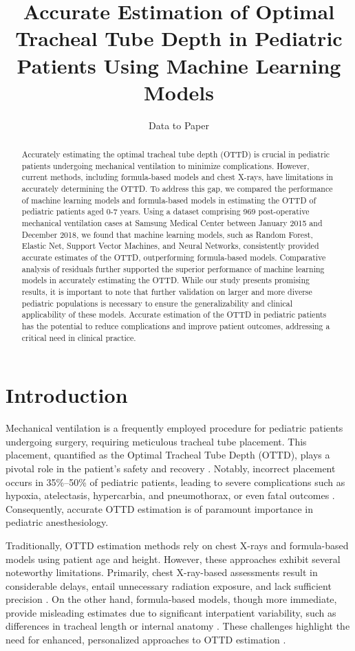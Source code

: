 \documentclass[11pt]{article}
\title{Accurate Estimation of Optimal Tracheal Tube Depth in Pediatric Patients Using Machine Learning Models}
\author{Data to Paper}
\begin{document}
\maketitle
\begin{abstract}
Accurately estimating the optimal tracheal tube depth (OTTD) is crucial in pediatric patients undergoing mechanical ventilation to minimize complications. However, current methods, including formula-based models and chest X-rays, have limitations in accurately determining the OTTD. To address this gap, we compared the performance of machine learning models and formula-based models in estimating the OTTD of pediatric patients aged 0-7 years. Using a dataset comprising 969 post-operative mechanical ventilation cases at Samsung Medical Center between January 2015 and December 2018, we found that machine learning models, such as Random Forest, Elastic Net, Support Vector Machines, and Neural Networks, consistently provided accurate estimates of the OTTD, outperforming formula-based models. Comparative analysis of residuals further supported the superior performance of machine learning models in accurately estimating the OTTD. While our study presents promising results, it is important to note that further validation on larger and more diverse pediatric populations is necessary to ensure the generalizability and clinical applicability of these models. Accurate estimation of the OTTD in pediatric patients has the potential to reduce complications and improve patient outcomes, addressing a critical need in clinical practice.
\end{abstract}
\section*{Introduction}

Mechanical ventilation is a frequently employed procedure for pediatric patients undergoing surgery, requiring meticulous tracheal tube placement. This placement, quantified as the Optimal Tracheal Tube Depth (OTTD), plays a pivotal role in the patient's safety and recovery \cite{Kollef1994EndotrachealTM}. Notably, incorrect placement occurs in 35\%--50\% of pediatric patients, leading to severe complications such as hypoxia, atelectasis, hypercarbia, and pneumothorax, or even fatal outcomes \cite{Friedmann2007MisplacementOP}. Consequently, accurate OTTD estimation is of paramount importance in pediatric anesthesiology.

Traditionally, OTTD estimation methods rely on chest X-rays and formula-based models using patient age and height. However, these approaches exhibit several noteworthy limitations. Primarily, chest X-ray-based assessments result in considerable delays, entail unnecessary radiation exposure, and lack sufficient precision \cite{Kollef1994EndotrachealTM}. On the other hand, formula-based models, though more immediate, provide misleading estimates due to significant interpatient variability, such as differences in tracheal length or internal anatomy \cite{Pengas2009ComparativeRO}. These challenges highlight the need for enhanced, personalized approaches to OTTD estimation \cite{Alkema2014ChildME}.
\end{document}
